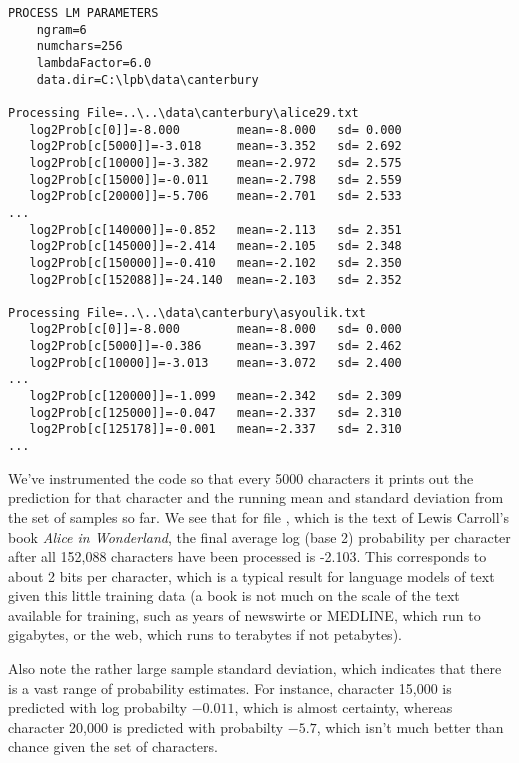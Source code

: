 \begin{verbatim}
PROCESS LM PARAMETERS
    ngram=6
    numchars=256
    lambdaFactor=6.0
    data.dir=C:\lpb\data\canterbury

Processing File=..\..\data\canterbury\alice29.txt
   log2Prob[c[0]]=-8.000        mean=-8.000   sd= 0.000
   log2Prob[c[5000]]=-3.018     mean=-3.352   sd= 2.692
   log2Prob[c[10000]]=-3.382    mean=-2.972   sd= 2.575
   log2Prob[c[15000]]=-0.011    mean=-2.798   sd= 2.559
   log2Prob[c[20000]]=-5.706    mean=-2.701   sd= 2.533
...
   log2Prob[c[140000]]=-0.852   mean=-2.113   sd= 2.351
   log2Prob[c[145000]]=-2.414   mean=-2.105   sd= 2.348
   log2Prob[c[150000]]=-0.410   mean=-2.102   sd= 2.350
   log2Prob[c[152088]]=-24.140  mean=-2.103   sd= 2.352

Processing File=..\..\data\canterbury\asyoulik.txt
   log2Prob[c[0]]=-8.000        mean=-8.000   sd= 0.000
   log2Prob[c[5000]]=-0.386     mean=-3.397   sd= 2.462
   log2Prob[c[10000]]=-3.013    mean=-3.072   sd= 2.400
...
   log2Prob[c[120000]]=-1.099   mean=-2.342   sd= 2.309
   log2Prob[c[125000]]=-0.047   mean=-2.337   sd= 2.310
   log2Prob[c[125178]]=-0.001   mean=-2.337   sd= 2.310
...
\end{verbatim}
%
We've instrumented the code so that every 5000 characters it prints
out the prediction for that character and the running mean and
standard deviation from the set of samples so far.  We see that for
file , which is the text of Lewis Carroll's book
{\it Alice in Wonderland}, the final average log (base 2) probability
per character after all 152,088 characters have been processed is
-2.103.  This corresponds to about 2 bits per character, which is a
typical result for language models of text given this little training
data (a book is not much on the scale of the text available for
training, such as years of newswirte or MEDLINE, which run to
gigabytes, or the web, which runs to terabytes if not petabytes).

Also note the rather large sample standard deviation, which
indicates that there is a vast range of probability estimates.  For
instance, character 15,000 is predicted with log probabilty $-0.011$,
which is almost certainty, whereas character 20,000 is predicted with
probabilty $-5.7$, which isn't much better than chance given the set
of characters.  

